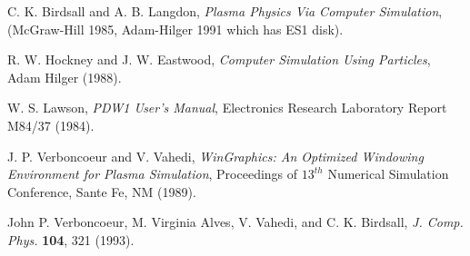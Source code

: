 \newpage
\center\begin{thebibliography}{99}

C. K. Birdsall and A. B. Langdon, {\em Plasma Physics Via Computer Simulation}, (McGraw-Hill 1985, Adam-Hilger 1991 
which has ES1 disk).

R. W. Hockney and J. W. Eastwood, {\em Computer Simulation Using Particles}, Adam Hilger (1988).

W. S. Lawson, {\em PDW1 User's Manual}, Electronics Research Laboratory 
Report M84/37 (1984).

J. P. Verboncoeur and V. Vahedi, {\em WinGraphics: An Optimized Windowing 
Environment for Plasma Simulation}, Proceedings of $13^{th}$ 
Numerical Simulation Conference, Sante Fe, NM (1989).

John P. Verboncoeur, M. Virginia Alves, V. Vahedi, and
C. K. Birdsall, {\em J. Comp. Phys.} {\bf 104}, 321 (1993).
\end{thebibliography}


